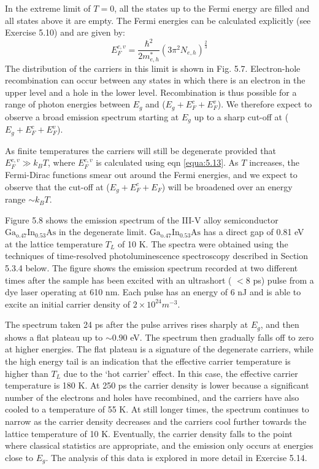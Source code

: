 \documentclass[12pt]{book}
\begin{document}
In the extreme limit of $T = 0$, all the states up to the Fermi energy are filled and all states above it are empty. The Fermi energies can be calculated explicitly (see Exercise 5.10) and are given by:
\begin{equation}\label{equa:5.13}
  E_F^{c,v}=\frac{\hbar^2}{2m_{e,h}^*}(3\pi^2N_{e,h})^{\frac{2}{3}}
\end{equation}
The distribution of the carriers in this limit is shown in Fig. 5.7. Electron-hole recombination can occur between any states in which there is an electron in the upper level and a hole in the lower level. Recombination is thus possible for a range of photon energies between $E_g$ and ($E_g+E_F^c+E_F^v$). We therefore expect to observe a broad emission spectrum starting at $E_g$ up to a sharp cut-off at ($E_g+E_F^c+E_F^v$).

As finite temperatures the carriers will still be degenerate provided that $E_F^{c,v}\gg k_BT$, where $E_F^{c,v}$ is calculated using eqn \ref{equa:5.13}. As $T$ increases, the Fermi-Dirac functions smear out around the Fermi energies, and we expect to observe that the cut-off at ($E_g + E_F^c + E_F$) will be broadened over an energy range $\sim k_BT$.

Figure 5.8 shows the emission spectrum of the III-V alloy semiconductor $\mathrm{Ga_{o.47}In_{0.53}As}$ in the degenerate limit. $\mathrm{Ga_{o.47}In_{0.53}As}$ has a direct gap of 0.81 eV at the lattice temperature $T_L$ of 10 K. The spectra were obtained using the techniques of time-resolved photoluminescence spectroscopy described in Section 5.3.4 below. The figure shows the emission spectrum recorded at two different times after the sample has been excited with an ultrashort ( $<8$ ps) pulse from a dye laser operating at 610 nm. Each pulse has an energy of 6 nJ and is able to excite an initial carrier density of $2\times 10^{24}m^{-3}$.

The spectrum taken 24 ps after the pulse arrives rises sharply at $E_g$, and then shows a flat plateau up to $\sim0.90$ eV. The spectrum then gradually falls off to zero at higher energies. The flat plateau is a signature of the degenerate carriers, while the high energy tail is an indication that the effective carrier temperature is higher than $T_L$ due to the `hot carrier' effect. In this case, the effective carrier temperature is 180 K. At 250 ps the carrier density is lower because a significant number of the electrons and holes have recombined, and the carriers have also cooled to a temperature of 55 K. At still longer times, the spectrum continues to narrow as the carrier density decreases and the carriers cool further towards the lattice temperature of 10 K. Eventually, the carrier density falls to the point where classical statistics are appropriate, and the emission only occurs at energies close to $E_g$. The analysis of this data is explored in more detail in Exercise 5.14.
\end{document}
